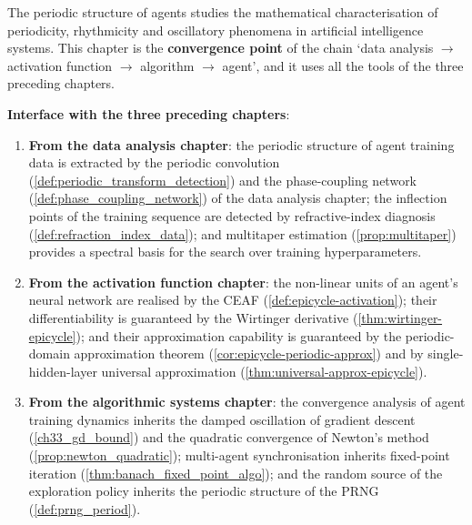 \begin{remark}\label{rem:agent-chapter-positioning}
The periodic structure of agents studies the mathematical characterisation of periodicity, rhythmicity and oscillatory phenomena in artificial intelligence systems. This chapter is the \textbf{convergence point} of the chain `data analysis $\to$ activation function $\to$ algorithm $\to$ agent', and it uses all the tools of the three preceding chapters.

\textbf{Interface with the three preceding chapters}:
\begin{enumerate}[label=(\arabic*)]
    \item \textbf{From the data analysis chapter}: the periodic structure of agent training data is extracted by the periodic convolution (\cref{def:periodic_transform_detection}) and the phase-coupling network (\cref{def:phase_coupling_network}) of the data analysis chapter; the inflection points of the training sequence are detected by refractive-index diagnosis (\cref{def:refraction_index_data}); and multitaper estimation (\cref{prop:multitaper}) provides a spectral basis for the search over training hyperparameters.
    \item \textbf{From the activation function chapter}: the non-linear units of an agent's neural network are realised by the CEAF (\cref{def:epicycle-activation}); their differentiability is guaranteed by the Wirtinger derivative (\cref{thm:wirtinger-epicycle}); and their approximation capability is guaranteed by the periodic-domain approximation theorem (\cref{cor:epicycle-periodic-approx}) and by single-hidden-layer universal approximation (\cref{thm:universal-approx-epicycle}).
    \item \textbf{From the algorithmic systems chapter}: the convergence analysis of agent training dynamics inherits the damped oscillation of gradient descent (\cref{ch33_gd_bound}) and the quadratic convergence of Newton's method (\cref{prop:newton_quadratic}); multi-agent synchronisation inherits fixed-point iteration (\cref{thm:banach_fixed_point_algo}); and the random source of the exploration policy inherits the periodic structure of the PRNG (\cref{def:prng_period}).
\end{enumerate}


\end{remark}

